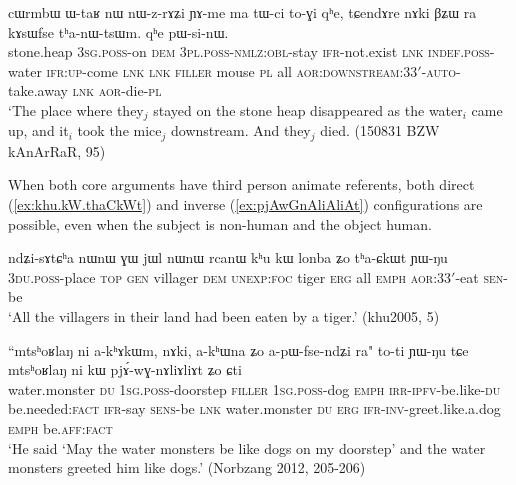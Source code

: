 \begin{exe}
\ex \label{ex:BZW.thanWtsWM}
\gll cɯrmbɯ ɯ-taʁ nɯ nɯ-z-rɤʑi ɲɤ-me ma tɯ-ci to-ɣi qʰe, tɕendɤre nɤki βʑɯ ra kɤsɯfse tʰa-nɯ-tsɯm. qʰe pɯ-si-nɯ. \\
stone.heap \textsc{3sg}.\textsc{poss}-on \textsc{dem} \textsc{3pl}.\textsc{poss}-\textsc{nmlz}:\textsc{obl}-stay \textsc{ifr}-not.exist \textsc{lnk} \textsc{indef}.\textsc{poss}-water \textsc{ifr}:\textsc{up}-come \textsc{lnk} \textsc{lnk} \textsc{filler} mouse \textsc{pl} all \textsc{aor}:\textsc{downstream}:3\fl{}3$'$-\textsc{auto}-take.away \textsc{lnk} \textsc{aor}-die-\textsc{pl} \\
\glt `The place where they$_j$ stayed on the stone heap disappeared as the water$_i$ came up, and it$_i$ took the mice$_j$ downstream. And they$_j$ died.  (150831 BZW kAnArRaR, 95)
\end{exe}

When both core arguments have third person animate referents, both direct (\ref{ex:khu.kW.thaCkWt}) and inverse (\ref{ex:pjAwGnAliAliAt}) configurations are possible, even when the subject is non-human and the object human.

\begin{exe}
\ex \label{ex:khu.kW.thaCkWt}
\gll ndʑi-sɤtɕʰa nɯnɯ ɣɯ jɯl nɯnɯ rcanɯ kʰu kɯ lonba ʑo tʰa-ɕkɯt ɲɯ-ŋu  \\
\textsc{3du}.\textsc{poss}-place \textsc{top} \textsc{gen} villager \textsc{dem} \textsc{unexp}:\textsc{foc} tiger \textsc{erg} all \textsc{emph} \textsc{aor}:\textsc{3}\fl{}3$'$-eat \textsc{sen}-be \\
 \glt `All the villagers in their land had been eaten by a tiger.'  (khu2005, 5)
\end{exe}

\begin{exe}
\ex \label{ex:pjAwGnAliAliAt}
\gll ``mtsʰoʁlaŋ ni a-kʰɤkɯm, nɤki, a-kʰɯna ʑo a-pɯ-fse-ndʑi ra" to-ti ɲɯ-ŋu tɕe mtsʰoʁlaŋ ni kɯ pjɤ́-wɣ-nɤliɤliɤt ʑo ɕti   \\
water.monster \textsc{du} \textsc{1sg}.\textsc{poss}-doorstep \textsc{filler} \textsc{1sg}.\textsc{poss}-dog \textsc{emph} \textsc{irr}-\textsc{ipfv}-be.like-\textsc{du} be.needed:\textsc{fact} \textsc{ifr}-say \textsc{sens}-be \textsc{lnk} water.monster \textsc{du} \textsc{erg} \textsc{ifr}-\textsc{inv}-greet.like.a.dog \textsc{emph} be.\textsc{aff}:\textsc{fact} \\
\glt `He said `May the water monsters be like dogs on my doorstep' and the water monsters greeted him like dogs.' (Norbzang 2012, 205-206)
\end{exe}

